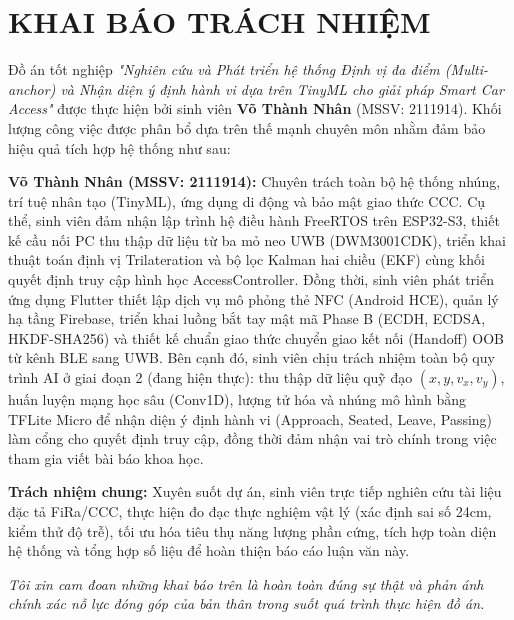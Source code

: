 \newpage
\appendix
\chapter{\MakeUppercase{KHAI BÁO TRÁCH NHIỆM}}
Đồ án tốt nghiệp \textit{"Nghiên cứu và Phát triển hệ thống Định vị đa điểm (Multi-anchor) và Nhận diện ý định hành vi dựa trên TinyML cho giải pháp Smart Car Access"} được thực hiện bởi sinh viên \textbf{Võ Thành Nhân} (MSSV: 2111914). Khối lượng công việc được phân bổ dựa trên thế mạnh chuyên môn nhằm đảm bảo hiệu quả tích hợp hệ thống như sau:

\textbf{Võ Thành Nhân (MSSV: 2111914):} Chuyên trách toàn bộ hệ thống nhúng, trí tuệ nhân tạo (TinyML), ứng dụng di động và bảo mật giao thức CCC. Cụ thể, sinh viên đảm nhận lập trình hệ điều hành FreeRTOS trên ESP32-S3, thiết kế cầu nối PC thu thập dữ liệu từ ba mỏ neo UWB (DWM3001CDK), triển khai thuật toán định vị Trilateration và bộ lọc Kalman hai chiều (EKF) cùng khối quyết định truy cập hình học AccessController. Đồng thời, sinh viên phát triển ứng dụng Flutter thiết lập dịch vụ mô phỏng thẻ NFC (Android HCE), quản lý hạ tầng Firebase, triển khai luồng bắt tay mật mã Phase B (ECDH, ECDSA, HKDF-SHA256) và thiết kế chuẩn giao thức chuyển giao kết nối (Handoff) OOB từ kênh BLE sang UWB. Bên cạnh đó, sinh viên chịu trách nhiệm toàn bộ quy trình AI ở giai đoạn 2 (đang hiện thực): thu thập dữ liệu quỹ đạo $(x, y, v_x, v_y)$, huấn luyện mạng học sâu (Conv1D), lượng tử hóa và nhúng mô hình bằng TFLite Micro để nhận diện ý định hành vi (Approach, Seated, Leave, Passing) làm cổng cho quyết định truy cập, đồng thời đảm nhận vai trò chính trong việc tham gia viết bài báo khoa học.

\textbf{Trách nhiệm chung:} Xuyên suốt dự án, sinh viên trực tiếp nghiên cứu tài liệu đặc tả FiRa/CCC, thực hiện đo đạc thực nghiệm vật lý (xác định sai số 24cm, kiểm thử độ trễ), tối ưu hóa tiêu thụ năng lượng phần cứng, tích hợp toàn diện hệ thống và tổng hợp số liệu để hoàn thiện báo cáo luận văn này.

\vspace{1cm}
\noindent \textit{Tôi xin cam đoan những khai báo trên là hoàn toàn đúng sự thật và phản ánh chính xác nỗ lực đóng góp của bản thân trong suốt quá trình thực hiện đồ án.}

